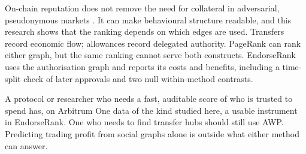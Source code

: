 
On-chain reputation does not remove the need for collateral in adversarial, pseudonymous markets . It can make behavioural structure readable, and this research shows that the ranking depends on which edges are used. Transfers record economic flow; allowances record delegated authority. PageRank can rank either graph, but the same ranking cannot serve both constructs. EndorseRank uses the authorisation graph and reports its costs and benefits, including a time-split check of later approvals and two null within-method contrasts.

A protocol or researcher who needs a fast, auditable score of who is trusted to spend has, on Arbitrum One data of the kind studied here, a usable instrument in EndorseRank. One who needs to find transfer hubs should still use AWP. Predicting trading profit from social graphs alone is outside what either method can answer.

